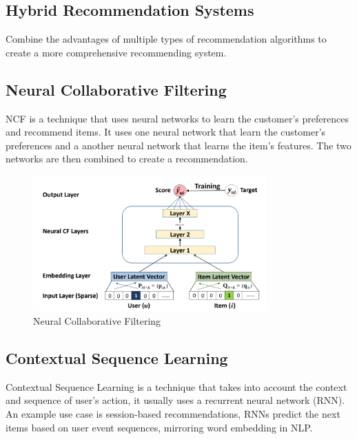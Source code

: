 \subsection{Hybrid Recommendation Systems}
Combine the advantages of multiple types of recommendation algorithms to create a more comprehensive recommending system.
\subsection{Neural Collaborative Filtering}
NCF is a technique that uses neural networks to learn the customer's preferences and recommend items. It uses one neural network that learn the customer's preferences and a another neural network that learns the item's features. The two networks are then combined to create a recommendation.
\begin{figure}[H]
    \centering
    \includegraphics[width=0.8\textwidth]{assets/neural-collaborative-filtering.png}
    \caption[Neural Collaborative Filtering]{Neural Collaborative Filtering \cite{NvidiaRecSys}}
    \label{fig:neural-collaborative-filtering}
\end{figure}

\subsection{Contextual Sequence Learning}
Contextual Sequence Learning is a technique that takes into account the context and sequence of user's action, it usually uses a recurrent neural network (RNN).
An example use case is session-based recommendations, RNNs predict the next items based on user event sequences, mirroring word embedding in NLP.
